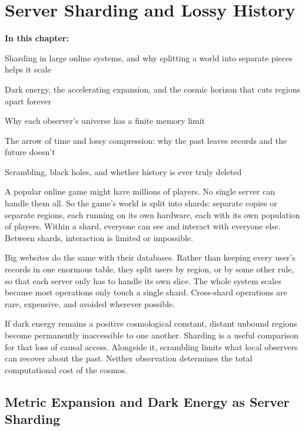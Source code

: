 \chapter{Server Sharding and Lossy History}

\begin{chaptermapbox}
\textbf{In this chapter:}
\begin{compactchecklist}
\item Sharding in large online systems, and why splitting a world into separate pieces helps it scale
\item Dark energy, the accelerating expansion, and the cosmic horizon that cuts regions apart forever
\item Why each observer's universe has a finite memory limit
\item The arrow of time and lossy compression: why the past leaves records and the future doesn't
\item Scrambling, black holes, and whether history is ever truly deleted
\end{compactchecklist}
\end{chaptermapbox}

A popular online game might have millions of players. No single server can handle them all. So the game's world is split into shards: separate copies or separate regions, each running on its own hardware, each with its own population of players. Within a shard, everyone can see and interact with everyone else. Between shards, interaction is limited or impossible.

Big websites do the same with their databases. Rather than keeping every user's records in one enormous table, they split users by region, or by some other rule, so that each server only has to handle its own slice. The whole system scales because most operations only touch a single shard. Cross-shard operations are rare, expensive, and avoided wherever possible.

If dark energy remains a positive cosmological constant, distant unbound regions become permanently inaccessible to one another. Sharding is a useful comparison for that loss of causal access. Alongside it, scrambling limits what local observers can recover about the past. Neither observation determines the total computational cost of the cosmos.

\section{Metric Expansion and Dark Energy as Server Sharding}

